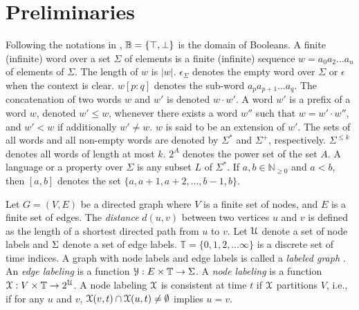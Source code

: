 \section{Preliminaries}

Following the notations in \cite{Falcone2011,Pinisetty2016runtime,falconeruntime1}, $\mathbb{B} = \{\top,\bot\}$ is the domain of Booleans. \noindent A finite (infinite) word over a set $\Sigma$ of elements is a finite (infinite) sequence $w=a_0a_2 \dots a_n$ of elements of $\Sigma$. The length of $w$ is $|w|$. $\epsilon_\Sigma$ denotes the empty word over $\Sigma$ or $\epsilon$ when the context is clear. 
$w[p:q]$ denotes the sub-word $a_pa_{p+1}\dots a_q$.
The concatenation of two words $w$ and $w'$ is denoted $w \cdot w'$. A word $w'$ is a prefix of a word $w$, denoted $w' \leq w$, whenever there exists a word $w''$ such that $w=w' \cdot w''$, and $w' < w$ if additionally $w'\neq w$. $w$ is said to be an extension of $w'$.  
The sets of all words and all non-empty words are denoted by $\Sigma^*$ and $\Sigma^+$, respectively. $\Sigma^{\leq k}$ denotes all words of length at most $k$. $2^A$ denotes the power set of the set $A$. 
A language or a property over $\Sigma$ is any subset $L$ of $\Sigma^*$. If $a,b \in \mathbb{N}_{\geq 0}$ and $a < b$, then $[a,b]$ denotes the set $\{a,a+1,a+2,\dots,b-1,b\}$.


Let $G=(V, E)$ be a directed graph where $V$ is a finite set of nodes, and $E$ is a finite set of edges. The \emph{distance} $d(u,v)$ between two vertices $u$ and $v$ is defined as the length of a shortest directed path from $u$ to $v$. 
Let $\mathcal{U}$ denote a set of node labels and $\Sigma$ denote a set of edge labels. %
$\mathbb{T}=\{0,1, 2, \dots \infty \}$ is a discrete set of time indices.
A graph with node labels and edge labels is called a \textit{labeled graph} \cite{west_introduction_2000}. 
An \emph{edge labeling} is a function $\mathcal{Y}:E \times \mathbb{T} \to \Sigma$.
A  \emph{node labeling} is a function $\mathcal{X}: V \times \mathbb{T} \to 2^{\mathcal{U}}$. %
A node labeling $\mathcal{X}$ is consistent at time $t$ if $\mathcal{X}$ partitions $V$, i.e., if for any $u$ and $v$, $\mathcal{X}(v,t) \cap \mathcal{X}(u,t) \neq \emptyset$ implies $u = v$. 

